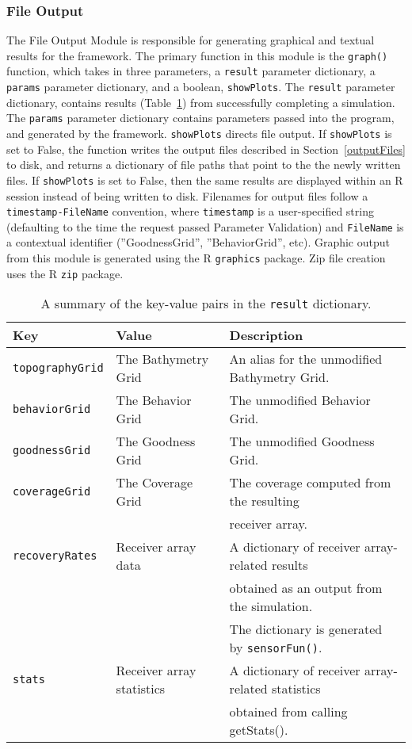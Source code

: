 \subsubsection{File Output}
The File Output Module is responsible for generating graphical and textual results for the framework.  The primary function in this module is the \texttt{graph()} function, which takes in three parameters, a \texttt{result} parameter dictionary, a \texttt{params} parameter dictionary, and a boolean, \texttt{showPlots}.  The \texttt{result} parameter dictionary, contains results (Table~\ref{resultDict}) from successfully completing a simulation.  The \texttt{params} parameter dictionary contains parameters passed into the program, and generated by the framework.  \texttt{showPlots} directs file output.  If \texttt{showPlots} is set to False, the function writes the output files described in Section~\ref{outputFiles} to disk, and returns a dictionary of file paths that point to the the newly written files.  If \texttt{showPlots} is set to False, then the same results are displayed within an R session instead of being written to disk.  Filenames for output files follow a \texttt{timestamp-FileName} convention, where \texttt{timestamp} is a user-specified string (defaulting to the time the request passed Parameter Validation) and \texttt{FileName} is a contextual identifier (''GoodnessGrid'', ''BehaviorGrid'', etc).  Graphic output from this module is generated using the R \texttt{graphics} package.  Zip file creation uses the 
R \texttt{zip} package.

\begin{table}[ht]
	\begin{tabular}{l l l}
		Key	&	Value &	Description\\
		\hline
		\texttt{topographyGrid}	&	The Bathymetry Grid			&	An alias for the unmodified Bathymetry Grid.\\
		\texttt{behaviorGrid}	&	The Behavior Grid			&	The unmodified Behavior Grid.\\
		\texttt{goodnessGrid}	&	The Goodness Grid			&	The unmodified Goodness Grid.\\
		\texttt{coverageGrid}	& 	The Coverage Grid			&	The coverage computed from the resulting\\
								&								&	receiver array.\\
		\texttt{recoveryRates}	& 	Receiver array data			&	A dictionary of receiver array-related results\\
								&								&  obtained as an output from the simulation. \\
								&								&  The dictionary is generated by \texttt{sensorFun()}.\\
		\texttt{stats}			& 	Receiver array statistics	&	A dictionary of receiver array-related statistics\\
								&								&  obtained from calling getStats().\\
	\end{tabular}
	\caption{A summary of the key-value pairs in the \texttt{result} dictionary.
		\label{resultDict}}
\end{table}

